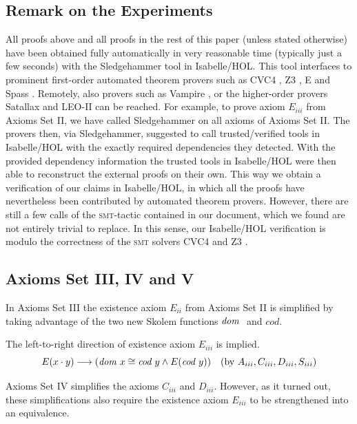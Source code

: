 \subsection{Remark on the Experiments}
All proofs above and all proofs in the rest of this paper (unless
stated otherwise) have been obtained fully automatically in very
reasonable time (typically just a few seconds) with the
Sledgehammer tool in Isabelle/HOL. This tool interfaces to prominent
first-order automated theorem provers such as CVC4 \cite{CVC4}, Z3
\cite{Z3}, E \cite{E} and Spass \cite{Spass}.  Remotely, also
  provers such as Vampire \cite{Vampire}, or the higher-order provers
  Satallax \cite{Satallax} and LEO-II \cite{LEO} can be reached. For
  example, to prove axiom $E_{iii}$ from Axioms Set II, we have called
  Sledgehammer on all axioms of Axioms Set II. The provers then, via
  Sledgehammer, suggested to call trusted/verified tools in
  Isabelle/HOL with the exactly required dependencies they
  detected. With the provided dependency information the trusted tools
  in Isabelle/HOL were then able to reconstruct the external proofs on
  their own.  This way we obtain a verification of our claims in
  Isabelle/HOL, in which all the proofs have nevertheless been
  contributed by automated theorem provers. However, there are still
  a few calls of the \textsc{smt}-tactic contained in our document, 
   which we found are not entirely trivial to replace. In this sense, our
   Isabelle/HOL verification is modulo the correctness of the \textsc{smt} solvers
   CVC4 \cite{CVC4} and Z3 \cite{Z3}.



\subsection{Axioms Set III, IV and V} 
In Axioms Set III the existence  axiom  $E_{ii}$ from Axioms Set II  is simplified by taking advantage of 
  the two new Skolem functions ${\textit{dom \/}}$ and $cod$.

The left-to-right direction of existence axiom $E_{iii}$ is implied.
  $$E(x \cdot y) \longrightarrow (\textit{dom \/} x \cong \textit{cod \/} y \wedge E(\textit{cod \/} y)) \quad  
    (\text{by } A_{iii}, C_{iii}, D_{iii}, S_{iii})$$


Axioms Set IV simplifies the axioms $C_{iii}$ and  $D_{iii}$. However, as it turned 
 out, these simplifications also require the existence axiom $E_{iii}$ to be strengthened into
 an equivalence.

